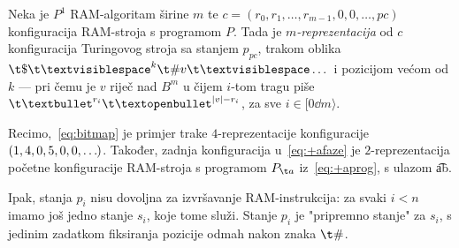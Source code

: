 \begin{definicija}[{name=[$m$-reprezentacija RAM-konfiguracije]}]
	Neka je $P^1$ RAM-algoritam širine $m$ te $c=(r_0,r_1,\dots,r_{m-1},0,0,\dots,pc)$ konfiguracija RAM-stroja s programom $P$. Tada je \emph{$m$-reprezentacija} od $c$ konfiguracija Turingovog stroja sa stanjem $p_{pc}$, trakom oblika $\t\$\bl^k\t\#v\bl\dots$ i pozicijom većom od $k$ --- pri čemu je $v$ riječ nad $B^m$ u čijem $i$-tom tragu piše $\t\textbullet^{r_i}\t\textopenbullet^{\dulj v-r_i}$, za sve $i\in[0\dd m\rangle$.
\end{definicija}

Recimo,~\eqref{eq:bitmap} je primjer trake $4$-reprezentacije konfiguracije $(1,4,0,5,0,0,\dots\mspace{-1mu})$. Također, zadnja konfiguracija u~\eqref{eq:+afaze} je $2$-reprezentacija početne konfiguracije RAM-stroja s programom $P_{\t a}$ iz~\eqref{eq:+aprog}, s ulazom \t{ab}.

Ipak, stanja $p_i$ nisu dovoljna za izvršavanje RAM-instrukcija: za svaki $i<n$ imamo još jedno stanje $s_i$, koje tome služi. Stanje $p_i$ je "pripremno stanje" za $s_i$, s jedinim zadatkom fiksiranja pozicije odmah nakon znaka $\t\#$.


